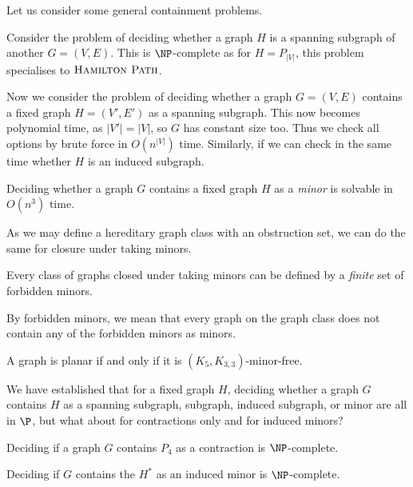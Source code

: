 Let us consider some general containment problems.

\begin{example}
  Consider the problem of deciding whether a graph $H$ is a spanning subgraph of another $G = (V,E)$. This is $\NP$-complete as for $H = P_{\lvert V \rvert}$, this problem specialises to $\text{\normalfont \textsc{Hamilton Path}}$.
\end{example}

\begin{example}
  Now we consider the problem of deciding whether a graph $G = (V,E)$ contains a fixed graph $H = (V', E')$ as a spanning subgraph. This now becomes polynomial time, as $\lvert V' \rvert = \lvert V \rvert$, so $G$ has constant size too. Thus we check all options by brute force in $O\left(n^{\lvert V \rvert}\right)$ time. Similarly, if we can check in the same time whether $H$ is an induced subgraph.
\end{example}

\begin{theorem}
  Deciding whether a graph $G$ contains a fixed graph $H$ as a \emph{minor} is solvable in $O(n^3)$ time.
\end{theorem}

As we may define a hereditary graph class with an obstruction set, we can do the same for closure under taking minors.

\begin{theorem}
  Every class of graphs closed under taking minors can be defined by a \emph{finite} set of forbidden minors.
\end{theorem}

By forbidden minors, we mean that every graph on the graph class does not contain any of the forbidden minors as minors.

\begin{theorem}[Wagner's]
  A graph is planar if and only if it is $(K_5, K_{3,3})$-minor-free.
\end{theorem}

We have established that for a fixed graph $H$, deciding whether a graph $G$ contains $H$ as a spanning subgraph, subgraph, induced subgraph, or minor are all in $\P$, but what about for contractions only and for induced minors?

\begin{theorem}
  Deciding if a graph $G$ contains $P_4$ as a contraction is $\NP$-complete.
\end{theorem}

\begin{theorem}
  Deciding if $G$ contains the $H^*$ as an induced minor is $\NP$-complete.
\end{theorem}

